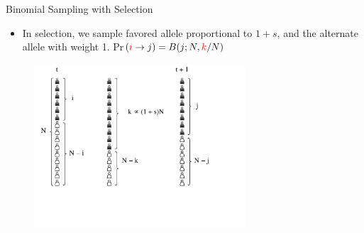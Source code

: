 \documentclass[t]{beamer} %
\begin{document}
\begin{frame}{ Binomial Sampling with Selection}
	\begin{itemize}
		\item 	In selection, we sample favored allele proportional to $1+s$, 
		and the alternate allele  with weight 1.
		Pr$(\textcolor{red}{i}\rightarrow 
		j)=B(j;N,\textcolor{red}{k}/N)$
	\end{itemize}
	
	\begin{figure}
		\includegraphics[trim={.05in 0in 0.0in 
			0.in},clip,width=0.7\textwidth]{../figures/selectiondrift.pdf}
	\end{figure}
\end{frame}
\end{document}

